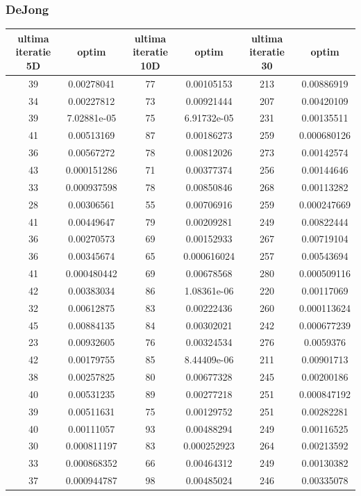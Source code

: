 \documentclass{article}
\begin{document}
\subsubsection{DeJong}
\begin{tabular}{cccccc}
\hline
ultima iteratie 5D& optim&ultima iteratie 10D& optim&ultima iteratie 30&optim\\
\hline
39&0.00278041&77&0.00105153&213&0.00886919 \\ \hline
34&0.00227812&73&0.00921444&207&0.00420109 \\ \hline
39&7.02881e-05&75&6.91732e-05&231&0.00135511 \\ \hline
41&0.00513169&87&0.00186273&259&0.000680126 \\ \hline
36&0.00567272&78&0.00812026&273&0.00142574 \\ \hline
43&0.000151286&71&0.00377374&256&0.00144646 \\ \hline
33&0.000937598&78&0.00850846&268&0.00113282 \\ \hline
28&0.00306561&55&0.00706916&259&0.000247669 \\ \hline
41&0.00449647&79&0.00209281&249&0.00822444 \\ \hline
36&0.00270573&69&0.00152933&267&0.00719104 \\ \hline
36&0.00345674&65&0.000616024&257&0.00543694 \\ \hline
41&0.000480442&69&0.00678568&280&0.000509116 \\ \hline
42&0.00383034&86&1.08361e-06&220&0.00117069 \\ \hline
32&0.00612875&83&0.00222436&260&0.000113624 \\ \hline
45&0.00884135&84&0.00302021&242&0.000677239 \\ \hline
23&0.00932605&76&0.00324534&276&0.0059376 \\ \hline
42&0.00179755&85&8.44409e-06&211&0.00901713 \\ \hline
38&0.00257825&80&0.00677328&245&0.00200186 \\ \hline
40&0.00531235&89&0.00277218&251&0.000847192 \\ \hline
39&0.00511631&75&0.00129752&251&0.00282281 \\ \hline
40&0.00111057&93&0.00488294&249&0.00116525 \\ \hline
30&0.000811197&83&0.000252923&264&0.00213592 \\ \hline
33&0.000868352&66&0.00464312&249&0.00130382 \\ \hline
37&0.000944787&98&0.00485024&246&0.00335078 \\ \hline

\end{tabular}
\end{document}
